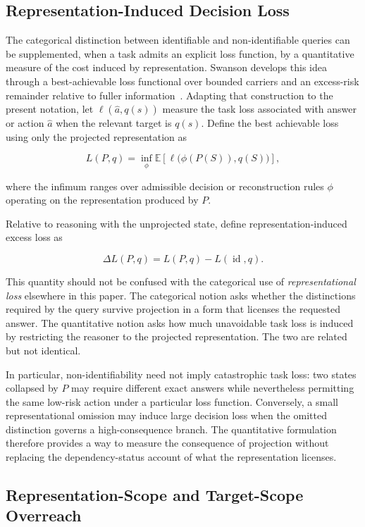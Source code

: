 \documentclass[11pt]{article}
\theoremstyle{definition}
\theoremstyle{remark}
\begin{document}
\subsection{Representation-Induced Decision Loss}

The categorical distinction between identifiable and non-identifiable queries can be supplemented, when a task admits an explicit loss function, by a quantitative measure of the cost induced by representation. Swanson develops this idea through a best-achievable loss functional over bounded carriers and an excess-risk remainder relative to fuller information~\cite{Swanson2026Carriers}. Adapting that construction to the present notation, let \(\ell(\hat a,q(s))\) measure the task loss associated with answer or action \(\hat a\) when the relevant target is \(q(s)\). Define the best achievable loss using only the projected representation as

\[
L(P,q)
=
\inf_{\phi}
\mathbb{E}
\left[
\ell\bigl(\phi(P(S)),q(S)\bigr)
\right],
\]

where the infimum ranges over admissible decision or reconstruction rules \(\phi\) operating on the representation produced by \(P\).

Relative to reasoning with the unprojected state, define representation-induced excess loss as

\[
\Delta L(P,q)
=
L(P,q)-L(\operatorname{id},q).
\]

This quantity should not be confused with the categorical use of \emph{representational loss} elsewhere in this paper. The categorical notion asks whether the distinctions required by the query survive projection in a form that licenses the requested answer. The quantitative notion asks how much unavoidable task loss is induced by restricting the reasoner to the projected representation. The two are related but not identical.

In particular, non-identifiability need not imply catastrophic task loss: two states collapsed by \(P\) may require different exact answers while nevertheless permitting the same low-risk action under a particular loss function. Conversely, a small representational omission may induce large decision loss when the omitted distinction governs a high-consequence branch. The quantitative formulation therefore provides a way to measure the consequence of projection without replacing the dependency-status account of what the representation licenses.

\subsection{Representation-Scope and Target-Scope Overreach}
\end{document}

